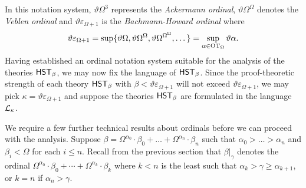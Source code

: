 \documentclass[UKenglish,cleveref,DIV=12]{scrartcl}
\theoremstyle{definition}
\theoremstyle{definition}
\begin{document}
In this notation system, $\vartheta\Omega^3$ represents the \emph{Ackermann ordinal}, $\vartheta\Omega^\Omega$ denotes the \emph{Veblen ordinal} and $\vartheta\varepsilon_{\Omega+1}$ is the \emph{Bachmann-Howard ordinal} where
\begin{align*}
 \vartheta\varepsilon_{\Omega+1}=\sup\{\vartheta\Omega, \vartheta\Omega^\Omega,\vartheta\Omega^{\Omega^\Omega},\dots\}=\sup_{\alpha\in\mathrm{OT}_\Omega}\vartheta\alpha.
\end{align*}
Having established an ordinal notation system suitable for the analysis of the theories $\mathsf{HST}_\beta$, we may now fix the language of $\mathsf{HST}_\beta$. Since the proof-theoretic strength of each theory $\mathsf{HST}_\beta$ with $\beta<\vartheta\varepsilon_{\Omega+1}$ will not exceed $\vartheta\varepsilon_{\Omega+1}$, we may pick $\kappa=\vartheta\varepsilon_{\Omega+1}$ and suppose the theories $\mathsf{HST}_\beta$ are formulated in the language $\mathcal{L}_\kappa$.

We require a few further technical results about ordinals before we can proceed with
the analysis. Suppose
$\beta=\Omega^{\alpha_0}\cdot\beta_0+\dots+\Omega^{\alpha_n}\cdot\beta_n$ such
that $\alpha_0>\dots>\alpha_n$ and $\beta_i<\Omega$ for each $i\le n$. Recall
from the previous section that $\beta|_\gamma$ denotes the ordinal
$\Omega^{\alpha_0}\cdot\beta_0+\cdots+\Omega^{\alpha_k}\cdot\beta_k$ where $k<n$
is the least such that $\alpha_{k}>\gamma\ge\alpha_{k+1}$, or $k=n$ if
$\alpha_n>\gamma$.
\end{document}
